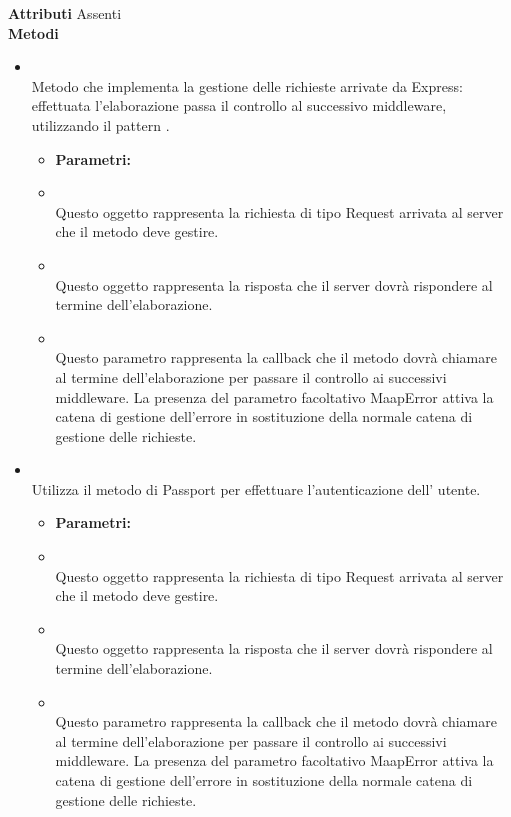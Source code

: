\textbf{Attributi}
Assenti \\
\textbf{Metodi}
\begin{itemize}
\item[] \textbf{} \\ Metodo che implementa la gestione delle richieste arrivate da Express: effettuata l'elaborazione passa il controllo al successivo middleware, utilizzando il pattern .
\begin{itemize}\addtolength{\itemsep}{-0.5\baselineskip}
\item[] \textbf{Parametri:}
\item[]  \\ Questo oggetto rappresenta la richiesta di tipo Request arrivata al server che il metodo deve gestire.
\item[]  \\ Questo oggetto rappresenta la risposta che il server dovrà rispondere al termine dell'elaborazione.
\item[]  \\ Questo parametro rappresenta la callback che il metodo dovrà chiamare al termine dell'elaborazione per passare il controllo ai successivi middleware. La presenza del parametro facoltativo MaapError attiva la catena di gestione dell'errore in sostituzione della normale catena di gestione delle richieste.
\end{itemize}
\item[] \textbf{} \\ Utilizza il metodo  di Passport per effettuare l'autenticazione dell' utente.
\begin{itemize}\addtolength{\itemsep}{-0.5\baselineskip}
\item[] \textbf{Parametri:}
\item[]  \\ Questo oggetto rappresenta la richiesta di tipo Request arrivata al server che il metodo deve gestire.
\item[]  \\ Questo oggetto rappresenta la risposta che il server dovrà rispondere al termine dell'elaborazione.
\item[]  \\ Questo parametro rappresenta la callback che il metodo dovrà chiamare al termine dell'elaborazione per passare il controllo ai successivi middleware. La presenza del parametro facoltativo MaapError attiva la catena di gestione dell'errore in sostituzione della normale catena di gestione delle richieste.

\end{itemize}
\end{itemize}
